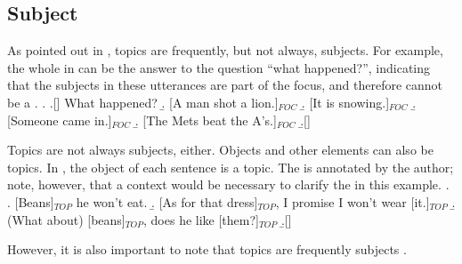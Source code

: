 
%
%
%

\subsection{Subject}

As pointed out in ,
topics are frequently, but not always, subjects.
For example, the whole  in \Next[a-d] can be the answer to the question ``what happened?'',
indicating that the subjects in these utterances are part of the focus,
and therefore cannot be a .
%
\ex.
  \a.[] What happened?
  \b. [A man shot a lion.]$_{FOC}$
  \b. [It is snowing.]$_{FOC}$
  \b. [Someone came in.]$_{FOC}$
  \b. [The Mets beat the A's.]$_{FOC}$
  \b.[] \hfill{\cite[49, modified by NN]{gundel74}}


Topics are not always subjects, either.
Objects and other elements can also be topics.
In \Next,
the object of each sentence is a topic.
The  is annotated by the author; note, however, that a context would be necessary to clarify the  in this example. 
%
\ex.
 \a. [Beans]$_{TOP}$ he won't eat.
 \b. [As for that dress]$_{TOP}$, I promise I won't wear [it.]$_{TOP}$
 \b. (What about) [beans]$_{TOP}$, does he like [them?]$_{TOP}$
 \b.[] \hfill{\cite[27, modified by NN]{gundel74}}

However, it is also important to note that topics are frequently subjects \cite{li76}.


